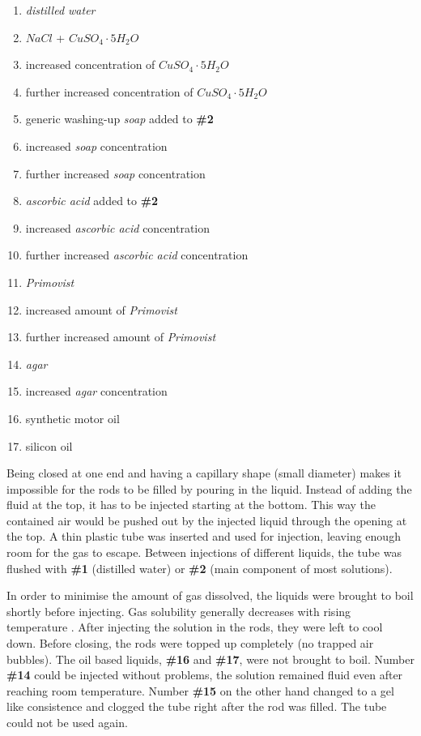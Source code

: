 \newpage
\begin{enumerate}[label=\textbf{\#\arabic*}]
 \item \textit{distilled water}
 \item $NaCl$ + $CuSO_4\cdot5H_2O$
 \item increased concentration of $CuSO_4\cdot5H_2O$
 \item further increased concentration of $CuSO_4\cdot5H_2O$
 \item generic washing-up \textit{soap} added to \textbf{\#2}
 \item increased \textit{soap} concentration
 \item further increased \textit{soap} concentration
 \item \textit{ascorbic acid} added to \textbf{\#2}
 \item increased \textit{ascorbic acid} concentration
 \item further increased \textit{ascorbic acid} concentration
 \item \textit{Primovist}
 \item increased amount of \textit{Primovist}
 \item further increased amount of \textit{Primovist}
 \item \textit{agar}
 \item increased \textit{agar} concentration
 \item synthetic motor oil
 \item silicon oil
\end{enumerate}


Being closed at one end and having a capillary shape (small diameter) makes it impossible for the rods to be filled by pouring in the liquid.
Instead of adding the fluid at the top, it has to be injected starting at the bottom.
This way the contained air would be pushed out by the injected liquid through the opening at the top.
A thin plastic tube was inserted and used for injection, leaving enough room for the gas to escape.
Between injections of different liquids, the tube was flushed with \textbf{\#1} (distilled water) or \textbf{\#2} (main component of most solutions).

In order to minimise the amount of gas dissolved, the liquids were brought to boil shortly before injecting. Gas solubility generally decreases with rising temperature \cite{Henry1803, Sander2015}.
After injecting the solution in the rods, they were left to cool down.
Before closing, the rods were topped up completely (no trapped air bubbles).
The oil based liquids, \textbf{\#16} and \textbf{\#17}, were not brought to boil.
Number \textbf{\#14} could be injected without problems, the solution remained fluid even after reaching room temperature.
Number \textbf{\#15} on the other hand changed to a gel like consistence and clogged the tube right after the rod was filled. The tube could not be used again.



